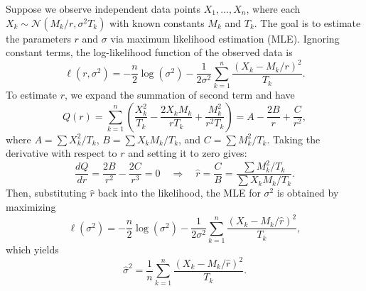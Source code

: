 \documentclass[mnsc]{informs3}
\begin{document}
\begin{APPENDICES}
Suppose we observe independent data points \( X_1, ..., X_n \), where each \( X_k \sim \mathcal{N}(M_k / r, \sigma^2 T_k) \) with known constants \( M_k \) and \( T_k \). 
The goal is to estimate the parameters \( r \) and \( \sigma \) via maximum likelihood estimation (MLE).
Ignoring constant terms, the log-likelihood function of the observed data is
\[
\ell(r, \sigma^2) = - \frac{n}{2} \log(\sigma^2) - \frac{1}{2\sigma^2} \sum_{k=1}^n \frac{\left( X_k - M_k/r \right)^2}{T_k}.
\]
To estimate $r$, we expand the summation of second term and have 
\[
Q(r) = \sum_{k=1}^n \left( \frac{X_k^2}{T_k} - \frac{2X_k M_k}{r T_k} + \frac{M_k^2}{r^2 T_k} \right)
= A - \frac{2B}{r} + \frac{C}{r^2},
\]
where \( A = \sum X_k^2/T_k \), \( B = \sum X_k M_k/T_k \), and \( C = \sum M_k^2/T_k \). Taking the derivative with respect to \( r \) and setting it to zero gives:
\begin{equation}\label{normal-mle-r}
\frac{dQ}{dr} = \frac{2B}{r^2} - \frac{2C}{r^3} = 0 \quad \Rightarrow \quad \hat{r} = \frac{C}{B} = \frac{\sum M_k^2/T_k}{\sum X_k M_k/T_k}.
\end{equation}
Then, substituting \( \hat{r} \) back into the likelihood, the MLE for \( \sigma^2 \) is obtained by maximizing
\[
\ell(\sigma^2) = -\frac{n}{2} \log(\sigma^2) - \frac{1}{2\sigma^2} \sum_{k=1}^n \frac{\left( X_k - M_k/\hat{r} \right)^2}{T_k},
\]
which yields
\begin{equation}\label{normal-mle-sigma}
\hat{\sigma}^2 = \frac{1}{n} \sum_{k=1}^n \frac{\left( X_k - M_k/\hat{r}\right)^2}{T_k}.
\end{equation}











\end{APPENDICES}










%



\end{document}

